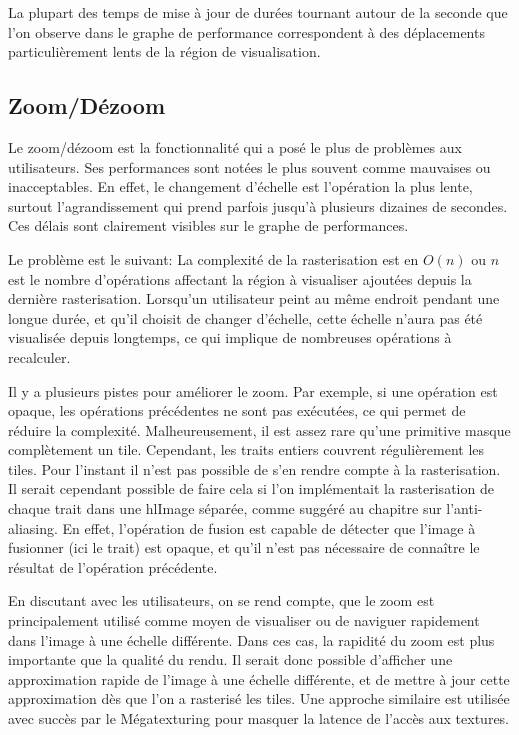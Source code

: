 		La plupart des temps de mise à jour de durées tournant autour de la seconde que l'on observe dans le graphe de performance correspondent
		à des déplacements particulièrement lents de la région de visualisation. 
		
		\subsection{Zoom/Dézoom}
		Le zoom/dézoom est la fonctionnalité qui a posé le plus de problèmes aux utilisateurs. Ses performances sont notées le plus souvent comme
		mauvaises ou inacceptables. En effet, le changement d'échelle est l'opération la plus lente, surtout l'agrandissement qui prend parfois
		jusqu'à plusieurs dizaines de secondes. Ces délais sont clairement visibles sur le graphe de performances. 
		
		Le problème est le suivant: La complexité de la rasterisation est en $O(n)$ ou $n$ est le nombre
		d'opérations affectant la région à visualiser ajoutées depuis la dernière rasterisation. 
		Lorsqu'un utilisateur peint au même endroit pendant une longue
		durée, et qu'il choisit de changer d'échelle, cette échelle n'aura pas été visualisée depuis longtemps, ce qui implique de 
		nombreuses opérations à recalculer. 
		
		Il y a plusieurs pistes pour améliorer le zoom. Par exemple, si une opération est opaque, les opérations précédentes ne sont pas exécutées,
		ce qui permet de réduire la complexité. Malheureusement, il est assez rare qu'une primitive masque complètement un tile. Cependant, les traits
		entiers couvrent régulièrement les tiles. Pour l'instant il n'est pas possible de s'en rendre compte à la rasterisation. Il serait cependant
		possible de faire cela si l'on implémentait la rasterisation de chaque trait dans une hlImage séparée, comme suggéré au chapitre sur l'anti-aliasing.
		En effet, l'opération de fusion est capable de détecter que l'image à fusionner (ici le trait) est opaque, et qu'il n'est pas nécessaire
		de connaître le résultat de l'opération précédente.

		En discutant avec les utilisateurs, on se rend compte, que le zoom est principalement utilisé comme moyen de visualiser ou de naviguer
		rapidement dans l'image à une échelle différente. Dans ces cas, la rapidité du zoom est plus importante que la qualité du rendu.
		Il serait donc possible d'afficher une approximation rapide de l'image à une échelle différente, et de mettre à jour cette approximation dès
		que l'on a rasterisé les tiles. Une approche similaire est utilisée avec succès par le Mégatexturing pour masquer la latence de l'accès aux 
		textures. 
